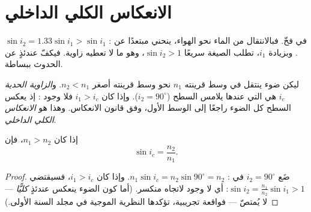 \section{الانعكاس الكلي الداخلي}

في  فخّ. فبالانتقال من الماء نحو الهواء، ينحني  مبتعدًا عن : $\sin i_2 = 1.33 \sin i_1 > \sin i_1$.
وبزيادة $i_1$، تطلب الصيغة سريعًا $\sin i_2 > 1$، وهو ما لا تعطيه
زاوية. فيكفّ  عندئذٍ عن الحدوث ببساطة.

\begin{definition}\label{def:g10:refraction:critical}
ليكن ضوء ينتقل في وسط قرينته $n_1$ نحو وسط قرينته
أصغر $n_2 < n_1$. و\emph{الزاوية الحدية}
$i_c$ هي  التي عندها يلامس 
السطح ($i_2 = 90^\circ$). وإذا كان $i_1 > i_c$ فلا وجود :
إذ يعكس السطح كل الضوء راجعًا إلى الوسط الأول، وفق
قانون الانعكاس. وهذا هو \emph{الانعكاس الكلي
الداخلي}.
\end{definition}

\begin{proposition}\label{prop:g10:refraction:criticalformula}
إذا كان $n_1 > n_2$، فإن
\[
\sin i_c = \frac{n_2}{n_1} .
\]
\end{proposition}

\begin{proof}
ضَع $i_2 = 90^\circ$ في : $n_1 \sin i_c = n_2 \sin 90^\circ
= n_2$. وإذا كان $i_1 > i_c$، فسيقتضي 
$\sin i_2 = \frac{n_1}{n_2}\sin i_1 > 1$: أي لا وجود لاتجاه منكسر.
(أما كون الضوء ينعكس عندئذٍ \emph{كليًّا} --- لا يُمتصّ --- فواقعة
تجريبية، تؤكدها النظرية الموجية في مجلد السنة
الأولى.)
\end{proof}

